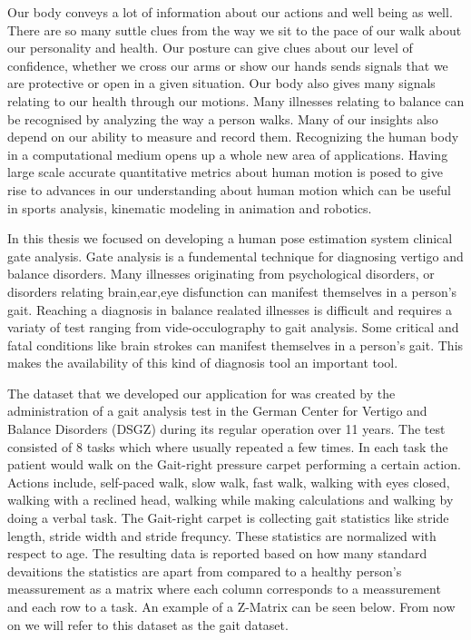 Our body conveys a lot of information about our actions and well being as well. There are so many suttle  clues from the way we sit to the pace of our walk about our personality and health. Our posture can give clues about our level of confidence, whether we cross our arms or show our hands sends signals that we are protective or open in a given situation. Our body also gives many signals relating to our health through our motions. Many illnesses relating to balance can be recognised by analyzing the way a person walks. Many of our insights also depend on our ability to measure and record them. Recognizing the human body in a computational medium opens up a whole new area of applications. Having large scale accurate quantitative metrics about human motion is posed to give rise to advances in our understanding about human motion which can be useful in sports analysis, kinematic modeling in animation and robotics. 

In this thesis we focused on developing a human pose estimation system clinical gate analysis. Gate analysis is a fundemental technique for diagnosing vertigo and balance disorders. Many illnesses originating from psychological disorders, or disorders relating brain,ear,eye disfunction can manifest themselves in a person's gait. Reaching a diagnosis in balance realated illnesses is difficult and requires a variaty of test ranging from vide-occulography to gait analysis. Some critical and fatal conditions like brain strokes can manifest themselves in a person's gait. This makes the availability of this kind of diagnosis tool an important tool.

The dataset that we developed our application for was created by the administration of a gait analysis test in the German Center for Vertigo and Balance Disorders (DSGZ) during its regular operation over 11 years. The test consisted of 8 tasks which where usually repeated a few times. In each task the patient would walk on the Gait-right pressure carpet performing a certain action. Actions include, self-paced walk, slow walk, fast walk, walking with eyes closed, walking with a reclined head, walking while making calculations and walking by doing a verbal task. The Gait-right carpet is collecting gait statistics like stride length, stride width and stride frequncy. These statistics are normalized with respect to age. The resulting data is reported based on how many standard devaitions the statistics are apart from compared to a healthy person's meassurement as a matrix where each column corresponds to a meassurement and each row to a task. An example of a Z-Matrix can be seen below. From now on we will refer to this dataset as the gait dataset.

